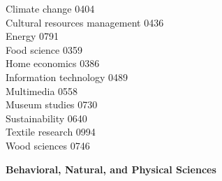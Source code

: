 \documentclass[9pt,twoside]{article}
\newcommand{\fieldheading}[1]{{\large \textbf{#1}}}
\begin{document}
\begin{multicols}{3}
Climate change \hfill 0404 \\
Cultural resources management \hfill 0436 \\
Energy \hfill 0791 \\
Food science \hfill 0359 \\
Home economics \hfill 0386 \\
Information technology \hfill 0489 \\
Multimedia \hfill 0558 \\
Museum studies \hfill 0730 \\
Sustainability \hfill 0640 \\
Textile research \hfill 0994 \\
Wood sciences \hfill 0746 \\
\end{multicols}
\clearpage
\fieldheading{Behavioral, Natural, and Physical Sciences}
\end{document}
